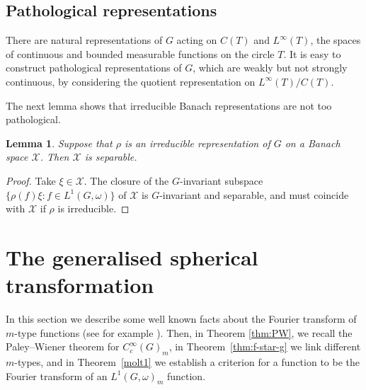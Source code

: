 \documentclass[12pt,a4paper]{amsart}
\newtheorem{lem}[thm]{Lemma}
\theoremstyle{definition}
\theoremstyle{remark}
\numberwithin{equation}{section}
\newcommand{\Ban}{\mathcal{X}}
\newcommand{\rep}{\rho}
\begin{document}
 \color{black}
\subsection*{Pathological representations}
There are natural representations of $G$ acting on $C(T)$ and $L^\infty(T)$, the spaces of continuous and bounded measurable functions on the circle $T$.
It is easy to construct pathological representations of $G$, which are weakly but not strongly continuous, by considering the quotient representation on $L^\infty(T)/C(T)$.

The next lemma shows that irreducible Banach representations are not too pathological.

\begin{lem}
Suppose that $\rep$ is an irreducible representation of $G$ on a Banach space $\Ban$.
Then $\Ban$ is separable.
\end{lem}

\begin{proof}
Take $\xi \in \Ban$.
The closure of the $G$-invariant subspace $\{\rep(f) \xi : f \in L^1(G,\omega) \}$ of $\Ban$ is $G$-invariant and separable, and must coincide with $\Ban$ if $\rep$ is irreducible.
\end{proof}



\section{The generalised spherical transformation}

{%
In this section we describe some well known facts about the Fourier transform of $m$-type functions (see for example \cite{B, Koo, RW, T}). 
Then, in Theorem \ref{thm:PW}, we recall the Paley--Wiener theorem for $C^\infty_c(G)_m$, in Theorem~\ref{thm:f-star-g} we link different $m$-types, 
and in Theorem~\ref{molt1} we establish a criterion for a function to be the Fourier transform of an $L^1(G, \omega)_m$ function.
}
\end{document}
